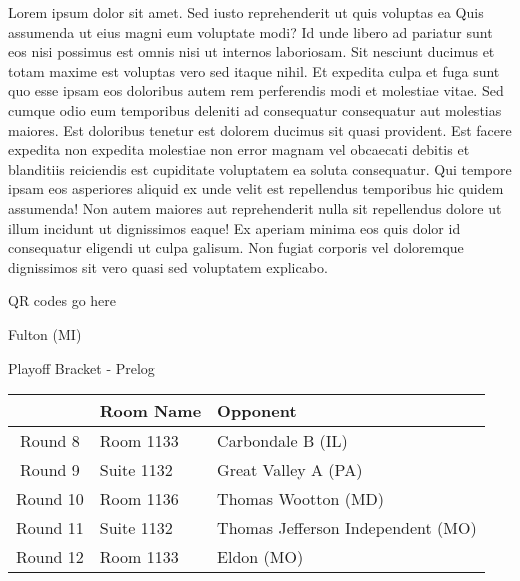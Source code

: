 \documentclass{article}%
\begin{document}
\vspace*{8pt}%
\linebreak%
\newline%
\newline%
Lorem ipsum dolor sit amet. Sed iusto reprehenderit ut quis voluptas ea Quis assumenda ut eius magni eum voluptate modi? Id unde libero ad pariatur sunt eos nisi possimus est omnis nisi ut internos laboriosam. Sit nesciunt ducimus et totam maxime est voluptas vero sed itaque nihil. Et expedita culpa et fuga sunt quo esse ipsam eos doloribus autem rem perferendis modi et molestiae vitae.\newline%
\newline%
Sed cumque odio eum temporibus deleniti ad consequatur consequatur aut molestias maiores. Est doloribus tenetur est dolorem ducimus sit quasi provident. Est facere expedita non expedita molestiae non error magnam vel obcaecati debitis et blanditiis reiciendis est cupiditate voluptatem ea soluta consequatur. Qui tempore ipsam eos asperiores aliquid ex unde velit est repellendus temporibus hic quidem assumenda!\newline%
\newline%
Non autem maiores aut reprehenderit nulla sit repellendus dolore ut illum incidunt ut dignissimos eaque! Ex aperiam minima eos quis dolor id consequatur eligendi ut culpa galisum. Non fugiat corporis vel doloremque dignissimos sit vero quasi sed voluptatem explicabo.\newline%
\newline%
%
\vspace*{30pt}%
\begin{center}%
\begin{Huge}%
QR codes go here%
\end{Huge}%
\end{center}%
\newpage%
\begin{center}%
\begin{Huge}%
Fulton (MI)%
\end{Huge}%
\vspace*{8pt}%
\linebreak%
\begin{Large}%
Playoff Bracket {-} Prelog%
\end{Large}%
\end{center}%
%
\begin{tabularx}{\textwidth}{|c|Y|Y|}%
\hline%
&Room Name&Opponent\\%
\hline%
Round 8&Room 1133&Carbondale B (IL)\\%
Round 9&Suite 1132&Great Valley A (PA)\\%
Round 10&Room 1136&Thomas Wootton (MD)\\%
Round 11&Suite 1132&Thomas Jefferson Independent (MO)\\%
Round 12&Room 1133&Eldon (MO)\\%
\hline%
\end{tabularx}%
\end{document}
